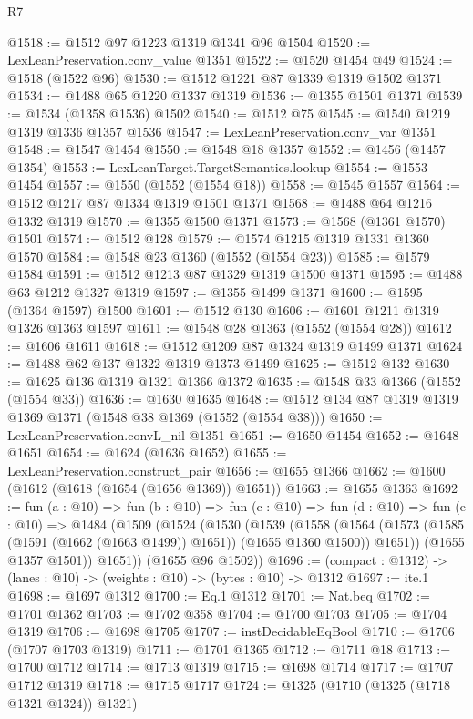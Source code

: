\begin{lexlean}{R7}
\begin{coremodule}
@1518 := @1512 @97 @1223 @1319 @1341 @96 @1504
@1520 := LexLeanPreservation.conv_value @1351
@1522 := @1520 @1454 @49
@1524 := @1518 (@1522 @96)
@1530 := @1512 @1221 @87 @1339 @1319 @1502 @1371
@1534 := @1488 @65 @1220 @1337 @1319
@1536 := @1355 @1501 @1371
@1539 := @1534 (@1358 @1536) @1502
@1540 := @1512 @75
@1545 := @1540 @1219 @1319 @1336 @1357 @1536
@1547 := LexLeanPreservation.conv_var @1351
@1548 := @1547 @1454
@1550 := @1548 @18 @1357
@1552 := @1456 (@1457 @1354)
@1553 := LexLeanTarget.TargetSemantics.lookup
@1554 := @1553 @1454
@1557 := @1550 (@1552 (@1554 @18))
@1558 := @1545 @1557
@1564 := @1512 @1217 @87 @1334 @1319 @1501 @1371
@1568 := @1488 @64 @1216 @1332 @1319
@1570 := @1355 @1500 @1371
@1573 := @1568 (@1361 @1570) @1501
@1574 := @1512 @128
@1579 := @1574 @1215 @1319 @1331 @1360 @1570
@1584 := @1548 @23 @1360 (@1552 (@1554 @23))
@1585 := @1579 @1584
@1591 := @1512 @1213 @87 @1329 @1319 @1500 @1371
@1595 := @1488 @63 @1212 @1327 @1319
@1597 := @1355 @1499 @1371
@1600 := @1595 (@1364 @1597) @1500
@1601 := @1512 @130
@1606 := @1601 @1211 @1319 @1326 @1363 @1597
@1611 := @1548 @28 @1363 (@1552 (@1554 @28))
@1612 := @1606 @1611
@1618 := @1512 @1209 @87 @1324 @1319 @1499 @1371
@1624 := @1488 @62 @137 @1322 @1319 @1373 @1499
@1625 := @1512 @132
@1630 := @1625 @136 @1319 @1321 @1366 @1372
@1635 := @1548 @33 @1366 (@1552 (@1554 @33))
@1636 := @1630 @1635
@1648 := @1512 @134 @87 @1319 @1319 @1369 @1371 (@1548 @38 @1369 (@1552 (@1554 @38)))
@1650 := LexLeanPreservation.convL_nil @1351
@1651 := @1650 @1454
@1652 := @1648 @1651
@1654 := @1624 (@1636 @1652)
@1655 := LexLeanPreservation.construct_pair
@1656 := @1655 @1366
@1662 := @1600 (@1612 (@1618 (@1654 (@1656 @1369)) @1651))
@1663 := @1655 @1363
@1692 := fun (a : @10) =>
  fun (b : @10) =>
  fun (c : @10) =>
  fun (d : @10) =>
  fun (e : @10) =>
  @1484
    (@1509
      (@1524
        (@1530
          (@1539
            (@1558
              (@1564 (@1573 (@1585 (@1591 (@1662 (@1663 @1499)) @1651)) (@1655 @1360 @1500)) @1651))
            (@1655 @1357 @1501))
          @1651))
      (@1655 @96 @1502))
@1696 := (compact : @1312) -> (lanes : @10) -> (weights : @10) -> (bytes : @10) -> @1312
@1697 := ite.{1}
@1698 := @1697 @1312
@1700 := Eq.{1} @1312
@1701 := Nat.beq
@1702 := @1701 @1362
@1703 := @1702 @358
@1704 := @1700 @1703
@1705 := @1704 @1319
@1706 := @1698 @1705
@1707 := instDecidableEqBool
@1710 := @1706 (@1707 @1703 @1319)
@1711 := @1701 @1365
@1712 := @1711 @18
@1713 := @1700 @1712
@1714 := @1713 @1319
@1715 := @1698 @1714
@1717 := @1707 @1712 @1319
@1718 := @1715 @1717
@1724 := @1325 (@1710 (@1325 (@1718 @1321 @1324)) @1321)

\end{coremodule}
\end{lexlean}
